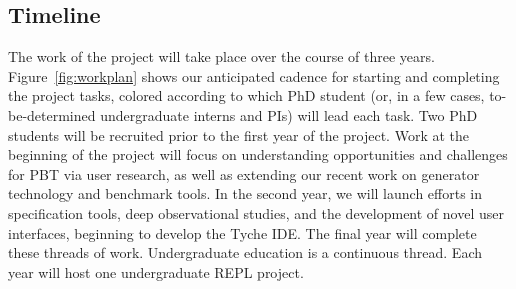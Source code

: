 
\subsection*{Timeline}

The work of the project will take place over the course of three years.
Figure~\ref{fig:workplan} shows our anticipated cadence for starting and
completing the project tasks, colored according to
which PhD student (or, in a few cases, to-be-determined undergraduate
interns and PIs) will
lead each task.
%
Two PhD students will be recruited prior to the first year of the project.  Work at the beginning
of the project will focus on understanding
opportunities and challenges for PBT via user research,
as well as extending our recent work on generator technology
and benchmark tools.
In the second year,
we will launch efforts in specification tools, deep observational
studies, and the development of novel user interfaces, beginning
to develop the Tyche IDE. The final year
will complete these threads of work.
Undergraduate education is a continuous thread.
Each year will host one undergraduate REPL project.




